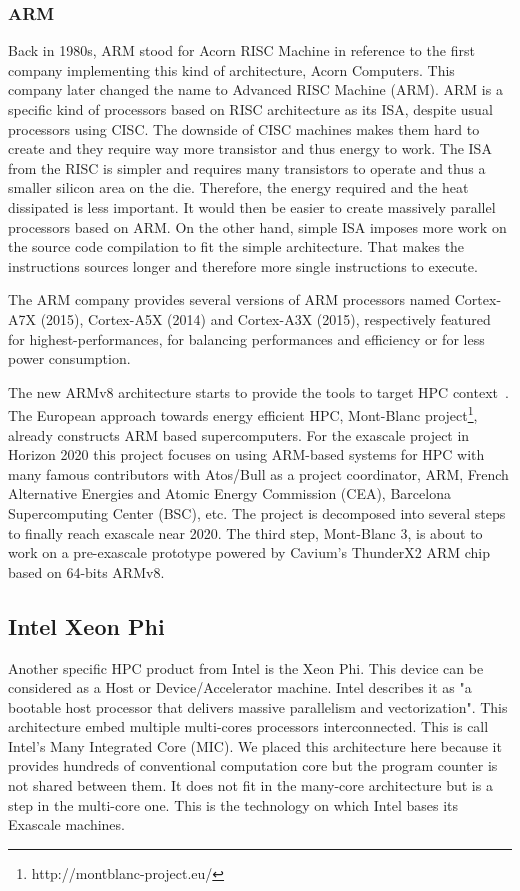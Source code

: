 \subsubsection{ARM}
Back in 1980s, ARM stood for Acorn RISC Machine in reference to the first company implementing this kind of architecture, Acorn Computers. 
This company later changed the name to Advanced RISC Machine (ARM). 
ARM is a specific kind of processors based on RISC architecture as its ISA, despite usual processors using CISC.
The downside of CISC machines makes them hard to create and they require way more transistor and thus energy to work. 
The ISA from the RISC is simpler and requires many transistors to operate and thus a smaller silicon area on the die.
Therefore, the energy required and the heat dissipated is less important. 
It would then be easier to create massively parallel processors based on ARM. 
On the other hand, simple ISA imposes more work on the source code compilation to fit the simple architecture. 
That makes the instructions sources longer and therefore more single instructions to execute. 

The ARM company provides several versions of ARM processors named Cortex-A7X (2015), Cortex-A5X (2014) and Cortex-A3X (2015), respectively featured for highest-performances, for balancing performances and efficiency or for less power consumption. 

The new ARMv8 architecture starts to provide the tools to target HPC context~\cite{rico2017arm}.
The European approach towards energy efficient HPC, Mont-Blanc project\footnote{http://montblanc-project.eu/}, already constructs ARM based supercomputers. 
For the exascale project in Horizon 2020 this project focuses on using ARM-based systems for HPC with many famous contributors with Atos/Bull as a project coordinator, ARM, French Alternative Energies and Atomic Energy Commission (CEA), Barcelona Supercomputing Center (BSC), etc.
The project is decomposed into several steps to finally reach exascale near 2020. 
The third step, Mont-Blanc 3, is about to work on a pre-exascale prototype powered by Cavium’s ThunderX2 ARM chip based on 64-bits ARMv8.

\subsection{Intel Xeon Phi}
Another specific HPC product from Intel is the Xeon Phi. 
This device can be considered as a Host or Device/Accelerator machine. 
Intel describes it as "a bootable host processor that delivers massive parallelism and vectorization".
This architecture embed multiple multi-cores processors interconnected. 
This is call Intel's Many Integrated Core (MIC).
We placed this architecture here because it provides hundreds of conventional computation core but the program counter is not shared between them. 
It does not fit in the many-core architecture but is a step in the multi-core one. 
This is the technology on which Intel bases its Exascale machines. 

